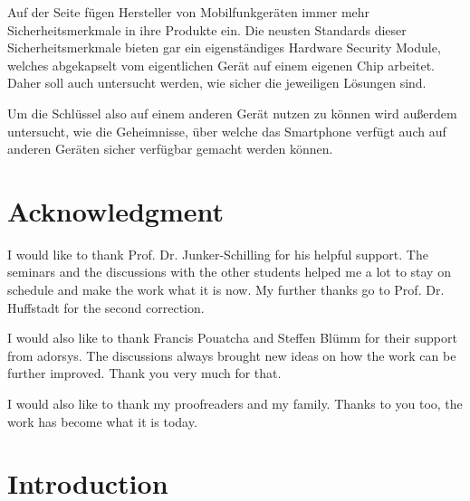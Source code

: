 \documentclass[12pt,oneside,a4paper,parskip]{scrbook}
\begin{document}
Auf der Seite fügen Hersteller von Mobilfunkgeräten immer mehr Sicherheitsmerkmale in ihre Produkte ein. Die neusten Standards dieser Sicherheitsmerkmale bieten gar ein eigenständiges Hardware Security Module, welches abgekapselt vom eigentlichen Gerät auf einem eigenen Chip arbeitet. Daher soll auch untersucht werden, wie sicher die jeweiligen Lösungen sind.

Um die Schlüssel also auf einem anderen Gerät nutzen zu können wird außerdem untersucht, wie die Geheimnisse, über welche das Smartphone verfügt auch auf anderen Geräten sicher verfügbar gemacht werden können. 

\newpage
\chapter*{Acknowledgment}

I would like to thank Prof. Dr. Junker-Schilling for his helpful support. The seminars and the discussions with the other students helped me a lot to stay on schedule and make the work what it is now. My further thanks go to Prof. Dr. Huffstadt for the second correction. 

I would also like to thank Francis Pouatcha and Steffen Blümm for their support from adorsys. The discussions always brought new ideas on how the work can be further improved. Thank you very much for that.

I would also like to thank my proofreaders and my family. Thanks to you too, the work has become what it is today.

\tableofcontents



\mainmatter

\chapter{Introduction}\label{ch:intro}
\end{document}
